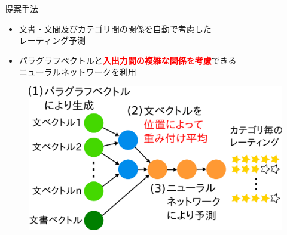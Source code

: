 \documentclass[aspectratio=43,unicode,10pt]{beamer}
\newcommand{\fire}[1]{\textcolor{red}{\textbf{#1}}}
\begin{document}
\begin{frame}{提案手法}{}
  \begin{itemize}
    \item 文書・文間及びカテゴリ間の関係を自動で考慮した\\レーティング予測
    \item パラグラフベクトルと\fire{入出力間の複雑な関係を考慮}できる \\
          ニューラルネットワークを利用
  \end{itemize}
  \begin{figure}
    \includegraphics[width=0.7\linewidth]
                    {fig/model_with_detailed_processes.png}
  \end{figure}
\end{frame}
\end{document}
